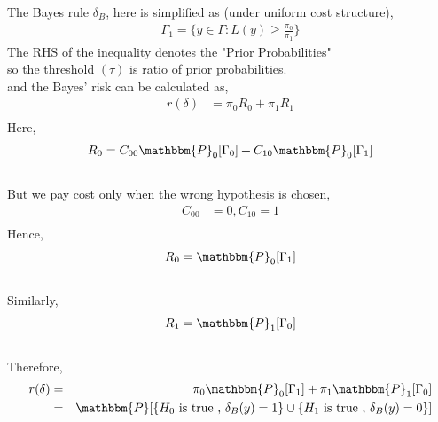 \documentclass[12pt]{report}
\begin{document}
\begin{itemize}
The Bayes rule $\delta_B$, here is simplified as (under uniform cost structure),
\begin{align*}
\Gamma_1 =\{y \in \Gamma : L(y) \geq \frac {\pi_0}{\pi_1}\}
\end{align*}
The RHS of the inequality denotes the "Prior Probabilities"\\
so the threshold $(\tau)$ is ratio of prior probabilities.\\
and the Bayes' risk can be calculated as,
\begin{eqnarray}
\nonumber
r(\delta)&= \pi_0 R_0 + \pi_1 R_1 \\
\nonumber
\end{eqnarray}
Here,
\begin{eqnarray}
 R_0 &= C_{00}  \mathbbm{P}_0[\Gamma_0]+C_{10}  \mathbbm{P}_0[\Gamma_1]\\
\nonumber
\end{eqnarray}
But we pay cost only when the wrong hypothesis is chosen, 
\begin{eqnarray}
\nonumber
C_{00}&=0,C_{10}=1\\
\nonumber
\end{eqnarray}
Hence, 
\begin{eqnarray}
\nonumber
R_0&=  \mathbbm{P}_0[\Gamma_1]\\
\nonumber
\end{eqnarray}
Similarly,
\begin{eqnarray}
\nonumber
R_1&=  \mathbbm{P}_1[\Gamma_0]\\
\nonumber
\end{eqnarray}
Therefore,
\begin{eqnarray}
\nonumber
r(\delta)&=& \pi_0  \mathbbm{P}_0[\Gamma_1]+\pi_1  \mathbbm{P}_1[\Gamma_0]\\
&=&\mathbbm{P}[\{H_0 \text{ is true , }  \delta_B(y) = 1\}  \cup \{H_1  \text{ is true , } \delta_B(y) = 0\}]
\nonumber
\end{eqnarray}



\end{itemize}
\end{document}
